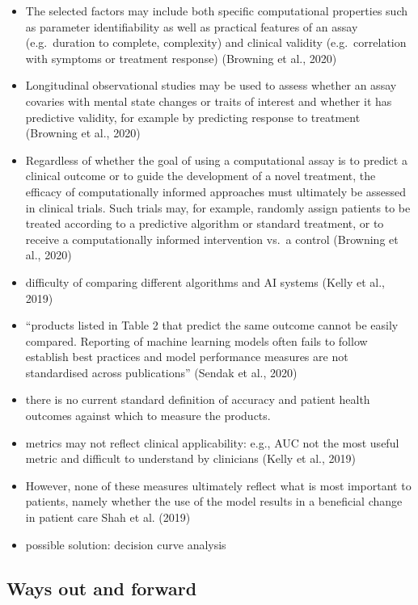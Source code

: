 \documentclass[
  man]{apa7}
\providecommand{\tightlist}{%
  \setlength{\itemsep}{0pt}\setlength{\parskip}{0pt}}
\begin{document}
\begin{itemize}
  \begin{itemize}
  \tightlist
  \item
    The selected factors may include both specific computational properties such as parameter identifiability as well as practical features of an assay (e.g.~duration to complete, complexity) and clinical validity (e.g.~correlation with symptoms or treatment response) (Browning et al., 2020)
  \item
    Longitudinal observational studies may be used to assess whether an assay covaries with mental state changes or traits of interest and whether it has predictive validity, for example by predicting response to treatment (Browning et al., 2020)
  \item
    Regardless of whether the goal of using a computational assay is to predict a clinical outcome or to guide the development of a novel treatment, the efficacy of computationally informed approaches must ultimately be assessed in clinical trials. Such trials may, for example, randomly assign patients to be treated according to a predictive algorithm or standard treatment, or to receive a computationally informed intervention vs.~a control (Browning et al., 2020)
  \item
    difficulty of comparing different algorithms and AI systems (Kelly et al., 2019)
  \item
    ``products listed in Table 2 that predict the same outcome cannot be easily compared. Reporting of machine learning models often fails to follow establish best practices and model performance measures are not standardised across publications'' (Sendak et al., 2020)
  \item
    there is no current standard definition of accuracy and patient health outcomes against which to measure the products.
  \item
    metrics may not reflect clinical applicability: e.g., AUC not the most useful metric and difficult to understand by clinicians (Kelly et al., 2019)
  \item
    However, none of these measures ultimately reflect what is most important to patients, namely whether the use of the model results in a beneficial change in patient care Shah et al. (2019)
  \item
    possible solution: decision curve analysis
  \end{itemize}
\end{itemize}

\hypertarget{ways-out-and-forward}{%
\subsection{Ways out and forward}\label{ways-out-and-forward}}
\end{document}
